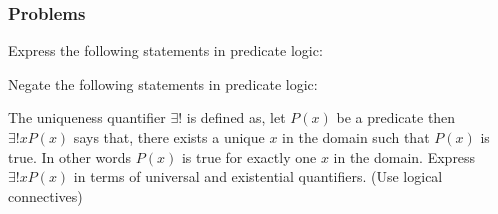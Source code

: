 \documentclass[12pt]{exam}
\begin{document}
\subsubsection*{Problems}
\begin{questions}
    \question Express the following statements in predicate logic:
    \question Negate the following statements in predicate logic:
    \question The uniqueness quantifier $\exists!$ is defined as, let $P(x)$ be a predicate then $\exists!x P(x)$ says that, there exists a unique $x$ in the domain such that $P(x)$ is true.
    In other words $P(x)$ is true for exactly one $x$ in the domain. Express $\exists!x P(x)$ in terms of universal and existential quantifiers. (Use logical connectives)
\end{questions}
\end{document}
